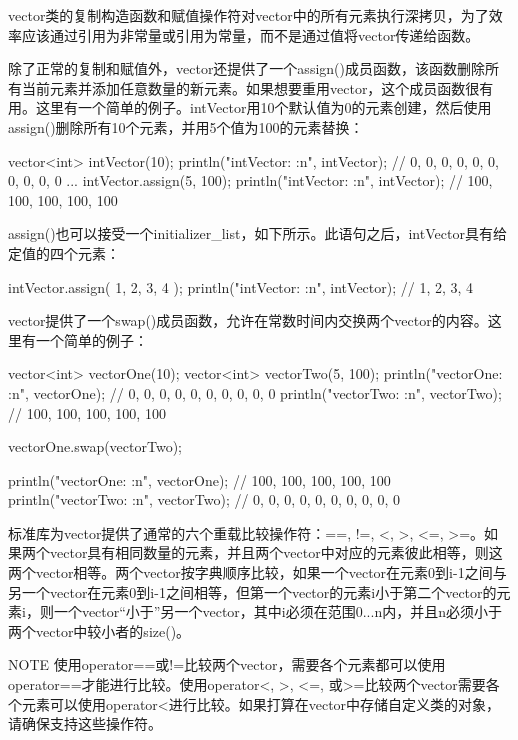 vector类的复制构造函数和赋值操作符对vector中的所有元素执行深拷贝，为了效率应该通过引用为非常量或引用为常量，而不是通过值将vector传递给函数。

除了正常的复制和赋值外，vector还提供了一个assign()成员函数，该函数删除所有当前元素并添加任意数量的新元素。如果想要重用vector，这个成员函数很有用。这里有一个简单的例子。intVector用10个默认值为0的元素创建，然后使用assign()删除所有10个元素，并用5个值为100的元素替换：

\begin{cpp}
vector<int> intVector(10);
println("intVector: {:n}", intVector); // 0, 0, 0, 0, 0, 0, 0, 0, 0, 0
...
intVector.assign(5, 100);
println("intVector: {:n}", intVector); // 100, 100, 100, 100, 100
\end{cpp}

assign()也可以接受一个initializer\_list，如下所示。此语句之后，intVector具有给定值的四个元素：

\begin{cpp}
intVector.assign({ 1, 2, 3, 4 });
println("intVector: {:n}", intVector); // 1, 2, 3, 4
\end{cpp}

vector提供了一个swap()成员函数，允许在常数时间内交换两个vector的内容。这里有一个简单的例子：

\begin{cpp}
vector<int> vectorOne(10);
vector<int> vectorTwo(5, 100);
println("vectorOne: {:n}", vectorOne); // 0, 0, 0, 0, 0, 0, 0, 0, 0, 0
println("vectorTwo: {:n}", vectorTwo); // 100, 100, 100, 100, 100

vectorOne.swap(vectorTwo);

println("vectorOne: {:n}", vectorOne); // 100, 100, 100, 100, 100
println("vectorTwo: {:n}", vectorTwo); // 0, 0, 0, 0, 0, 0, 0, 0, 0, 0
\end{cpp}


标准库为vector提供了通常的六个重载比较操作符：==, !=, <, >, <=, >=。如果两个vector具有相同数量的元素，并且两个vector中对应的元素彼此相等，则这两个vector相等。两个vector按字典顺序比较，如果一个vector在元素0到i-1之间与另一个vector在元素0到i-1之间相等，但第一个vector的元素i小于第二个vector的元素i，则一个vector“小于”另一个vector，其中i必须在范围0...n内，并且n必须小于两个vector中较小者的size()。

\begin{myNotic}{NOTE}
使用operator==或!=比较两个vector，需要各个元素都可以使用operator==才能进行比较。使用operator<, >, <=, 或>=比较两个vector需要各个元素可以使用operator<进行比较。如果打算在vector中存储自定义类的对象，请确保支持这些操作符。
\end{myNotic}

